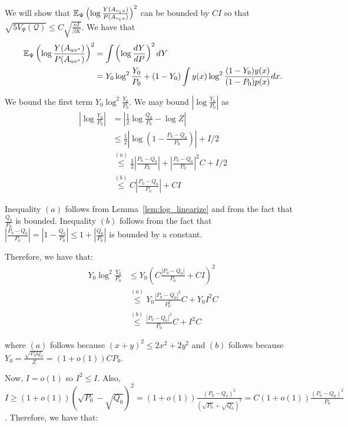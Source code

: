 \documentclass{article}
\begin{document}
We will show that ${\mathbb E}_{\Psi} \left( \log \frac{Y(A_{v_1 u})}{P(A_{v_1 u})} \right)^2$ can be bounded by $C I$ so that $\sqrt{ 5 V_{\Psi}(\mathcal{Q})} \leq C \sqrt{\frac{nI}{\beta K}} $. We have that
\begin{align}
{\mathbb E}_{\Psi} \left( \log \frac{Y(A_{uv^*})}{P(A_{uv^*})} \right)^2 &= 
    \int \left( \log \frac{dY}{dP} \right)^2 dY \nonumber \\
  &= Y_0 \log^2 \frac{Y_0}{P_0} + (1-Y_0) \int y(x) \log^2 \frac{(1-Y_0) y(x)}{(1-P_0)p(x)} dx. \label{eqn:lower_bound_var_terms}
\end{align}

We bound the first term $Y_0 \log^2 \frac{Y_0}{P_0}$. We may bound $\left| \log \frac{Y_0}{P_0} \right|$ as 
\begin{align*}
\left| \log \frac{Y_0}{P_0} \right|&= \left| \frac{1}{2} \log \frac{Q_0}{P_0} - \log Z \right| \\
    &\leq \frac{1}{2} \left| \log \left( 1 - \frac{P_0 - Q_0}{P_0} \right) \right| + I/2 \\ 
   & \stackrel{(a)} \leq \frac{1}{2} \left| \frac{P_0 - Q_0 }{P_0} \right| + \left| \frac{P_0 - Q_0}{P_0} \right|^2 C + I/2 \\   
   & \stackrel{(b)} \leq C \left| \frac{P_0 - Q_0}{P_0} \right| + C I 
\end{align*}

Inequality $(a)$ follows from Lemma~\ref{lem:log_linearize} and from the fact that $\frac{Q_0}{P_0}$ is bounded. Inequality $(b)$ follows from the fact that $\left| \frac{ P_0 - Q_0}{P_0} \right| = \left| 1 - \frac{Q_0}{P_0} \right| \leq 1 + \left| \frac{Q_0}{P_0} \right|$ is bounded by a constant. 

Therefore, we have that:
\begin{align*}
Y_0 \log^2 \frac{Y_0}{P_0} &\leq Y_0 \left( C \frac{ |P_0 - Q_0| }{P_0} + C I \right)^2 \\
     &\stackrel{(a)} \leq Y_0 \frac{|P_0 - Q_0|^2}{P_0^2 } C + Y_0 I^2 C \\
     &\stackrel{(b)} \leq \frac{|P_0 - Q_0|^2}{P_0} C + I^2 C 
\end{align*}

where $(a)$ follows because $(x + y)^2 \leq 2x^2 + 2y^2$ and $(b)$ follows because $Y_0 = \frac{\sqrt{P_0 Q_0}}{Z} = (1+o(1)) C P_0$. 

Now, $I = o(1)$ so $I^2 \leq I$. Also, $I \geq (1+o(1)) ( \sqrt{P_0} - \sqrt{Q_0})^2 = (1+o(1)) \frac{ (P_0 - Q_0)^2}{(\sqrt{P_0} + \sqrt{Q_0})^2} = C (1 + o(1)) \frac{ (P_0 - Q_0)^2 }{P_0}$. Therefore, we have that:
\end{document}

